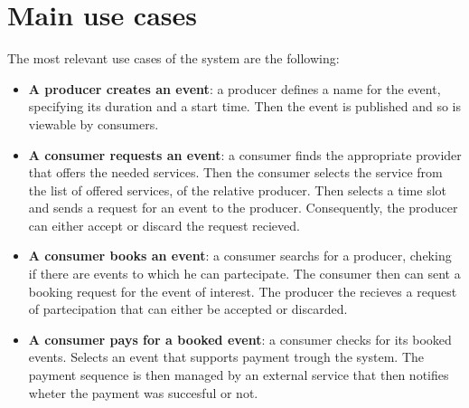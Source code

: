 \documentclass{article}
\begin{document}
\section{Main use cases}

The most relevant use cases of the system are the following:

\begin{itemize}
	\item \textbf{A producer creates an event}: a producer defines a name
		for the event, specifying its duration and a start time. Then
		the event is published and so is viewable by consumers.
	\item \textbf{A consumer requests an event}: a consumer finds the
		appropriate provider that offers the needed services. Then
		the consumer selects the service from the list of offered services,
		of the relative producer. Then selects a time slot and sends a 
		request for an event to the producer. Consequently, the
		producer can either accept or discard the request recieved.
	\item \textbf{A consumer books an event}: a consumer searchs for a producer,
		cheking if there are events to which he can partecipate.
		The consumer then can sent a booking request for the event of interest.
		The producer the recieves a request of partecipation that can either be
		accepted or discarded.
	\item \textbf{A consumer pays for a booked event}: a consumer checks for its
		booked events. Selects an event that supports payment trough the system.
		The payment sequence is then managed by an external service that then
		notifies wheter the payment was succesful or not.
\end{itemize}
\end{document}
